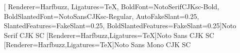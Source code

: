 


\SingleSpacing

\hypersetup{final}

\setlength{\columnsep}{1.2em}
\setlength{\columnseprule}{0.1mm}


\setlength{\parindent}{0cm}
\setlength{\parskip}{0.15\baselineskip}

\setlrmarginsandblock{3cm}{2cm}{*}
\checkandfixthelayout

\raggedbottom

[
 Renderer=Harfbuzz,
 Ligatures=TeX,
 BoldFont={NotoSerifCJKsc-Bold},
 BoldSlantedFont={NotoSansCJKsc-Regular},
 AutoFakeSlant=0.25,
 SlantedFeatures={FakeSlant=0.25},
 BoldSlantedFeatures={FakeSlant=0.25}]{Noto Serif CJK SC}
[Renderer=Harfbuzz,Ligatures=TeX]{Noto Sans CJK SC}
[Renderer=Harfbuzz,Ligatures=TeX]{Noto Sans Mono CJK SC}


\setcounter{secnumdepth}{2}
\makeatletter
\renewcommand{\@pnumwidth}{3em} 
\renewcommand{\@tocrmarg}{4em}
\makeatother
\renewcommand\cftbeforechapterskip{5pt plus 1pt}

